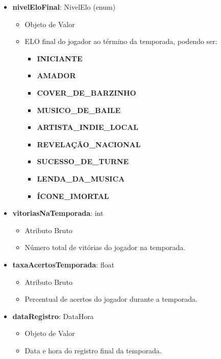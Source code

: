 \begin{itemize}
        \item \textbf{nivelEloFinal}: NivelElo (enum)  
              \begin{itemize}
                  \item Objeto de Valor
                  \item ELO final do jogador ao término da temporada, podendo ser:
                  \begin{itemize}
                      \item \textbf{INICIANTE}
                      \item \textbf{AMADOR}
                      \item \textbf{COVER\_DE\_BARZINHO}
                      \item \textbf{MUSICO\_DE\_BAILE}
                      \item \textbf{ARTISTA\_INDIE\_LOCAL}
                      \item \textbf{REVELAÇÃO\_NACIONAL}
                      \item \textbf{SUCESSO\_DE\_TURNE}
                      \item \textbf{LENDA\_DA\_MUSICA}
                      \item \textbf{ÍCONE\_IMORTAL}
                  \end{itemize}
              \end{itemize}
    
        \item \textbf{vitoriasNaTemporada}: int  
              \begin{itemize}
                  \item Atributo Bruto
                  \item Número total de vitórias do jogador na temporada.
              \end{itemize}
    
        \item \textbf{taxaAcertosTemporada}: float  
              \begin{itemize}
                  \item Atributo Bruto
                  \item Percentual de acertos do jogador durante a temporada.
              \end{itemize}
    
        \item \textbf{dataRegistro}: DataHora  
              \begin{itemize}
                  \item Objeto de Valor
                  \item Data e hora do registro final da temporada.
              \end{itemize}
    \end{itemize}


